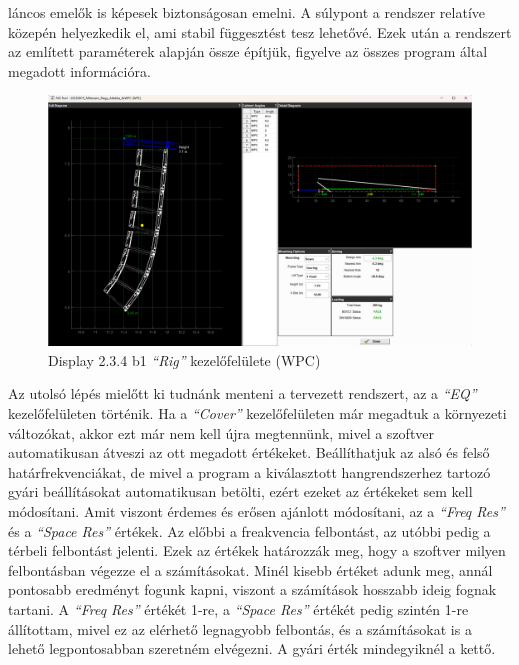 láncos emelők is képesek biztonságosan emelni. A súlypont a rendszer relatíve közepén helyezkedik el, ami stabil függesztést tesz lehetővé.
Ezek után a rendszert az említett paraméterek alapján össze építjük, figyelve az összes program által megadott információra.
\begin{figure}[H]
	\centering
	\includegraphics[width=\textwidth, keepaspectratio]{figures/display_wpc_4.png}
	\caption{Display 2.3.4 b1 \textit{``Rig''} kezelőfelülete (WPC)}\label{fig:display_wpc_4}
\end{figure}
Az utolsó lépés mielőtt ki tudnánk menteni a tervezett rendszert, az a \textit{``EQ''} kezelőfelületen történik.
Ha a \textit{``Cover''} kezelőfelületen már megadtuk a környezeti változókat, akkor ezt már nem kell újra megtennünk,
mivel a szoftver automatikusan átveszi az ott megadott értékeket. Beállíthatjuk az alsó és felső határfrekvenciákat, de mivel
a program a kiválasztott hangrendszerhez tartozó gyári beállításokat automatikusan betölti, ezért ezeket az értékeket sem kell módosítani.
Amit viszont érdemes és erősen ajánlott módosítani, az a \textit{``Freq Res''} és a \textit{``Space Res''} értékek. Az előbbi a
freakvencia felbontást, az utóbbi pedig a térbeli felbontást jelenti. Ezek az értékek határozzák meg, hogy a szoftver milyen 
felbontásban végezze el a számításokat. Minél kisebb értéket adunk meg, annál pontosabb eredményt fogunk kapni, viszont a számítások
hosszabb ideig fognak tartani. A \textit{``Freq Res''} értékét 1-re, a \textit{``Space Res''} értékét pedig szintén 1-re állítottam, mivel
ez az elérhető legnagyobb felbontás, és a számításokat is a lehető legpontosabban szeretném elvégezni. A gyári érték mindegyiknél a kettő.
